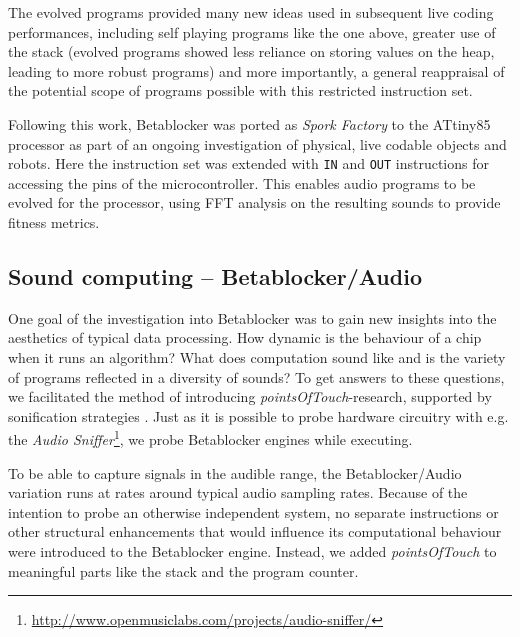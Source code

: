 \documentclass[letterpaper, 12pt]{article}
\begin{document}
The evolved programs provided many new ideas used in subsequent live coding performances,  including self playing programs like the one above, greater use of the stack (evolved programs showed less reliance on storing values on the heap, leading to more robust programs) and more importantly, a general reappraisal of the potential scope of programs possible with this restricted instruction set.

Following this work, Betablocker was ported as \emph{Spork Factory} to the ATtiny85 processor as part of an ongoing investigation of physical, live codable objects and robots.
Here the instruction set was extended with \texttt{IN} and \texttt{OUT} instructions for accessing the pins of the microcontroller.
This enables audio programs to be evolved for the processor, using FFT analysis on the resulting sounds to provide fitness metrics.
\parskip 18pt

\subsection{Sound computing -- Betablocker/Audio}
\label{sub:sound_computing}

One goal of the investigation into Betablocker was to gain new insights into the aesthetics of typical data processing.
How dynamic is the behaviour of a chip when it runs an algorithm?
What does computation sound like and is the variety of programs reflected in a diversity of sounds?
To get answers to these questions, we facilitated the method of introducing \emph{pointsOfTouch}-research, supported by sonification strategies \citep{bovermann2011-the}.
Just as it is possible to probe hardware circuitry with e.g. the \emph{Audio Sniffer}\footnote{\url{http://www.openmusiclabs.com/projects/audio-sniffer/}}, we probe Betablocker engines while executing.

To be able to capture signals in the audible range, the Betablocker/Audio variation runs at rates around typical audio sampling rates.
Because of the intention to probe an otherwise independent system, no separate instructions or other structural enhancements that would influence its computational behaviour were introduced to the Betablocker engine.
Instead, we added \emph{pointsOfTouch} to meaningful parts like the stack and the program counter.
\end{document}
